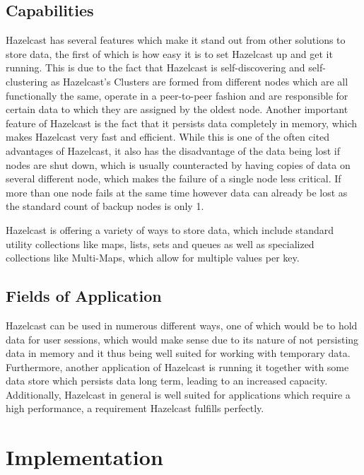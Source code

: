 \subsection{Capabilities} \label{subsec:capabilitiesHazelcast}
Hazelcast has several features which make it stand out from other solutions to store data, the first of which is how easy it is 
to set Hazelcast up and get it running. This is due to the fact that Hazelcast is self-discovering and self-clustering as Hazelcast's 
Clusters are formed from different nodes which are all functionally the same, operate in a peer-to-peer fashion and are responsible for 
certain data to which they are assigned by the oldest node. \cite{Johns.2015} \newline
Another important feature of Hazelcast is the fact that it persists data completely in memory, which makes Hazelcast very fast and efficient.
While this is one of the often cited advantages of Hazelcast, it also has the disadvantage of the data being lost if nodes are shut down, which 
is usually counteracted by having copies of data on several different node, which makes the failure of a single node less critical. If more than 
one node fails at the same time however data can already be lost as the standard count of backup nodes is only 1. \cite{Johns.2015} \newline

Hazelcast is offering a variety of ways to store data, which include standard utility collections like maps, lists, sets and queues as well as 
specialized collections like Multi-Maps, which allow for multiple values per key. \cite{Johns.2015}
\subsection{Fields of Application} \label{subsec:fieldsOfApplicationHazelcast}

Hazelcast can be used in numerous different ways, one of which would be to hold data for user sessions, which would make sense due to its nature 
of not persisting data in memory and it thus being well suited for working with temporary data. Furthermore, another application of Hazelcast is 
running it together with some data store which persists data long term, leading to an increased capacity. Additionally, Hazelcast in general is well 
suited for applications which require a high performance, a requirement Hazelcast fulfills perfectly. \cite{Johns.2015} \newline


\section{Implementation} \label{sec:implementationHazelcast}
